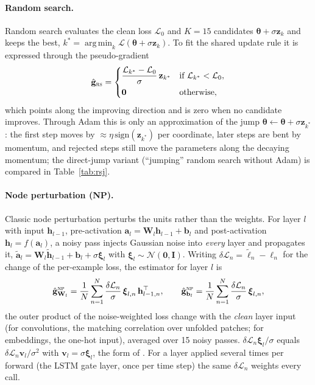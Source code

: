 \documentclass{article}
\newcommand{\method}[1]{\textsc{#1}}
\newcommand{\RS}{\method{rs}}
\newcommand{\NP}{\method{np}}
\newcommand{\ghat}{\hat{\mathbf{g}}}
\newcommand{\btheta}{\boldsymbol{\theta}}
\newcommand{\bxi}{\boldsymbol{\xi}}
\newcommand{\bz}{\mathbf{z}}
\newcommand{\bv}{\mathbf{v}}
\newcommand{\bh}{\mathbf{h}}
\newcommand{\ba}{\mathbf{a}}
\newcommand{\bb}{\mathbf{b}}
\newcommand{\bW}{\mathbf{W}}
\newcommand{\bI}{\mathbf{I}}
\newcommand{\dL}{\delta\mathcal{L}}
\newcommand{\loss}{\mathcal{L}}
\DeclareMathOperator*{\argmin}{arg\,min}
\begin{document}
\paragraph{Random search.}
Random search \citep{rastrigin1963,matyas1965,schumer1968} evaluates the clean loss
$\loss_0$ and $K=15$ candidates $\btheta+\sigma\bz_k$ and keeps the best,
$k^{*}=\argmin_k\loss(\btheta+\sigma\bz_k)$. To fit the shared update rule it is
expressed through the pseudo-gradient
\begin{equation}
  \ghat_{\RS}=
  \begin{cases}
    \dfrac{\loss_{k^{*}}-\loss_0}{\sigma}\,\bz_{k^{*}} & \text{if }\loss_{k^{*}}<\loss_0,\\[1.2ex]
    \mathbf{0} & \text{otherwise},
  \end{cases}
  \label{eq:rs}
\end{equation}
which points along the improving direction and is zero when no candidate improves.
Through Adam this is only an approximation of the jump $\btheta\leftarrow\btheta+\sigma\bz_{k^{*}}$:
the first step moves by $\approx\eta\,\mathrm{sign}(\bz_{k^{*}})$ per coordinate, later
steps are bent by momentum, and rejected steps still move the parameters along the
decaying momentum; the direct-jump variant (``jumping'' random search without Adam)
is compared in Table~\ref{tab:rsj}.

\paragraph{Node perturbation (NP).}
Classic node perturbation \citep{widrow1990,werfel2003,fiete2006,hiratani2022} perturbs
the units rather than the weights. For layer $l$ with input $\bh_{l-1}$,
pre-activation $\ba_l=\bW_l\bh_{l-1}+\bb_l$ and post-activation $\bh_l=f(\ba_l)$, a
noisy pass injects Gaussian noise into \emph{every} layer and propagates it,
$\tilde{\ba}_l=\bW_l\tilde{\bh}_{l-1}+\bb_l+\sigma\bxi_l$ with
$\bxi_l\sim\mathcal{N}(\mathbf{0},\bI)$. Writing $\dL_n=\tilde\ell_n-\ell_n$ for the
change of the per-example loss, the estimator for layer $l$ is
\begin{equation}
  \ghat_{\bW_l}^{\NP}=\frac{1}{N}\sum_{n=1}^{N}\frac{\dL_n}{\sigma}\,\bxi_{l,n}\,\bh_{l-1,n}^{\top},
  \qquad
  \ghat_{\bb_l}^{\NP}=\frac{1}{N}\sum_{n=1}^{N}\frac{\dL_n}{\sigma}\,\bxi_{l,n},
  \label{eq:np}
\end{equation}
the outer product of the noise-weighted loss change with the \emph{clean} layer input
(for convolutions, the matching correlation over unfolded patches; for embeddings, the
one-hot input), averaged over 15 noisy passes. $\dL_n\bxi_l/\sigma$ equals
$\dL_n\bv_l/\sigma^{2}$ with $\bv_l=\sigma\bxi_l$, the form of \citet{dalm2023}. For a
layer applied several times per forward (the LSTM gate layer, once per time step) the
same $\dL_n$ weights every call.
\end{document}
